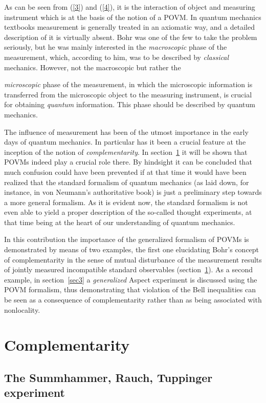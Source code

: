 \documentclass{ws-procs975x65}
\begin{document}
As can be seen from (\ref{3}) and  (\ref{4}), it is the
interaction of object and measuring instrument which is at the
basis of the notion of a POVM. In quantum mechanics textbooks
measurement is generally treated in an axiomatic way, and a
detailed description of it is virtually absent. Bohr was one of
the few to take the problem seriously, but he was mainly
interested in the \textit{macroscopic} phase of the measurement,
which, according to him, was to be described by \textit{classical}
mechanics. However, not the macroscopic but rather the
{\textit{microscopic} phase of the measurement, in which the
microscopic information is transferred from the microscopic object
to the measuring instrument, is crucial for obtaining
\textit{quantum} information. This phase should be described by
quantum mechanics.

The influence of measurement has been of the utmost importance in
the early days of quantum mechanics. In particular has it been a
crucial feature at the inception of the notion of
\textit{complementarity}. In section~\ref{sec2} it will be shown
that POVMs indeed play a crucial role there. By hindsight it can
be concluded that much confusion could have been prevented if at
that time it would have been realized that the standard formalism
of quantum mechanics (as laid down, for instance, in von Neumann's
authoritative book\cite{vN32}) is just a preliminary step towards
a more general formalism. As it is evident now, the standard
formalism is not even able to yield a proper description of the
so-called thought experiments, at that time being at the heart of
our understanding of quantum mechanics\cite{dM2002}.

In this contribution the importance of the generalized formalism
of POVMs is demonstrated by means of two examples, the first one
elucidating Bohr's concept of complementarity in the sense of
mutual disturbance of the measurement results of jointly measured
incompatible standard observables (section~\ref{sec2}). As a
second example, in section~\ref{sec3} a \textit{generalized}
Aspect experiment is discussed using the POVM formalism, thus
demonstrating that violation of the Bell inequalities can be seen
as a consequence of complementarity rather than as being
associated with nonlocality.

\section{Complementarity}\label{sec2}

\subsection{The Summhammer, Rauch, Tuppinger
experiment}\label{sec2.1}

}
\end{document}
